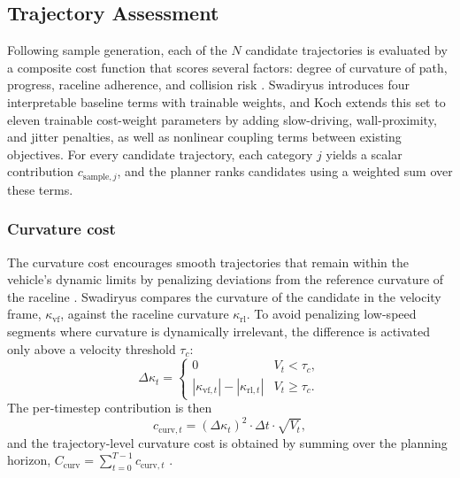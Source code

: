 \subsection{Trajectory Assessment}
\label{subsection:TrajectoryAssessment}

Following sample generation, each of the $N$ candidate trajectories is evaluated by a composite cost function that scores several factors: degree of curvature of path, progress, raceline adherence, and collision risk \cite{swadiryus_DifferentiableMotionPlanning_2025, koch_DifferentiableInterpretablePath_2025}.
Swadiryus \cite{swadiryus_DifferentiableMotionPlanning_2025} introduces four interpretable baseline terms with trainable weights, and Koch \cite{koch_DifferentiableInterpretablePath_2025} extends this set to eleven trainable cost-weight parameters by adding slow-driving, wall-proximity, and jitter penalties, as well as nonlinear coupling terms between existing objectives.
For every candidate trajectory, each category $j$ yields a scalar contribution $c_{\text{sample}, j}$, and the planner ranks candidates using a weighted sum over these terms.

\subsubsection{Curvature cost}
The curvature cost encourages smooth trajectories that remain within the vehicle's dynamic limits by penalizing deviations from the reference curvature of the raceline \cite{swadiryus_DifferentiableMotionPlanning_2025, koch_DifferentiableInterpretablePath_2025}.
Swadiryus compares the curvature of the candidate in the velocity frame, $\kappa_{\text{vf}}$, against the raceline curvature $\kappa_{\text{rl}}$.
To avoid penalizing low-speed segments where curvature is dynamically irrelevant, the difference is activated only above a velocity threshold $\tau_c$:
\begin{equation}
    \Delta\kappa_t =
    \begin{cases}
        0 & V_t < \tau_c, \\
        \left|\kappa_{\text{vf}, t}\right| - \left|\kappa_{\text{rl}, t}\right| & V_t \geq \tau_c.
    \end{cases}
\end{equation}
The per-timestep contribution is then
\begin{equation}
    c_{\text{curv}, t} = (\Delta\kappa_t)^2 \cdot \Delta t \cdot \sqrt{V_t},
\end{equation}
and the trajectory-level curvature cost is obtained by summing over the planning horizon, $C_{\text{curv}} = \sum_{t=0}^{T-1} c_{\text{curv}, t}$ \cite{swadiryus_DifferentiableMotionPlanning_2025}.

